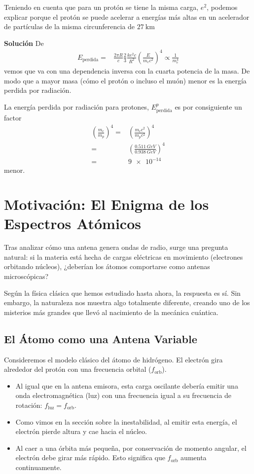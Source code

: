 \documentclass[11pt,a4paper]{book}
\begin{document}
 

Teniendo en cuenta que para un protón se tiene la misma carga, $e^2$, podemos explicar porque el protón se puede acelerar a energías más altas en un acelerador de partículas de la misma circunferencia de $\qty{27}{\kilo\meter}$

\textbf{Solución}
    De
    \begin{align*}
    E_{\text{perdida}} =&\frac{2\pi R}{c} \frac{2}{3} \frac{k e^2 c}{R^2}\left(\frac{E}{m_ec^2}\right)^4\propto \frac{1}{m_e^4}
   \end{align*}
vemos que va con una dependencia inversa con la cuarta potencia de la masa. De modo que a mayor masa (cómo el protón o incluso el muón) menor es la energía perdida por radiación.

La energía perdida por radiación para protones, $E^p_{\text{perdida}}$ es por consiguiente un factor
\begin{align*}
    \left(\frac{m_e}{m_p}\right)^4 =&  \left(\frac{m_e c^2}{m_p c^2}\right)^4\\
    =& \left(\frac{\qty{0.511}{GeV}}{{\qty{0.938}{GeV}}}\right)^4\\
    =&\num{9e-14}
\end{align*}
menor.

\section{Motivación: El Enigma de los Espectros Atómicos}

Tras analizar cómo una antena genera ondas de radio, surge una pregunta natural: si la materia está hecha de cargas eléctricas en movimiento (electrones orbitando núcleos), ¿deberían los átomos comportarse como antenas microscópicas?

Según la física clásica que hemos estudiado hasta ahora, la respuesta es sí. Sin embargo, la naturaleza nos muestra algo totalmente diferente, creando uno de los misterios más grandes que llevó al nacimiento de la mecánica cuántica.

\subsection{El Átomo como una Antena Variable}

Consideremos el modelo clásico del átomo de hidrógeno. El electrón gira alrededor del protón con una frecuencia orbital ($f_{\text{orb}}$).
\begin{itemize}
    \item Al igual que en la antena emisora, esta carga oscilante debería emitir una onda electromagnética (luz) con una frecuencia igual a su frecuencia de rotación: $f_{\text{luz}} = f_{\text{orb}}$.
    \item Como vimos en la sección sobre la inestabilidad, al emitir esta energía, el electrón pierde altura y cae hacia el núcleo.
    \item Al caer a una órbita más pequeña, por conservación de momento angular, el electrón debe girar más rápido. Esto significa que $f_{\text{orb}}$ aumenta continuamente.
\end{itemize}
\end{document}
